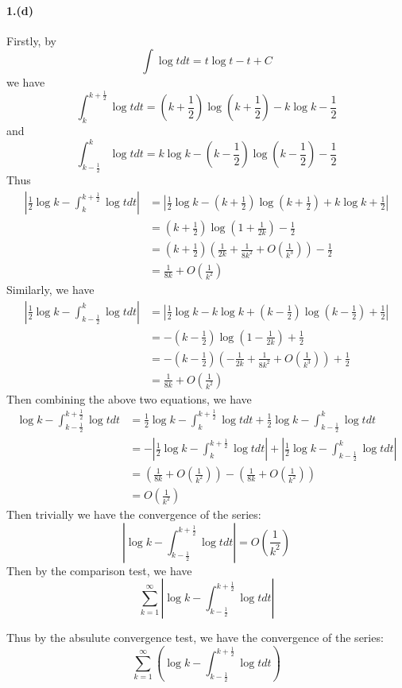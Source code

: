 \documentclass{article}
\begin{document}
\paragraph[short]{1.(d)}
{
  Firstly, by 
  $$\int \log t dt=t\log t-t+C$$
  we have
  $$\int_{k}^{k+\frac{1}{2}}\log t dt =
    (k+\frac{1}{2})\log(k+\frac{1}{2})-k\log k-\frac{1}{2}$$
and
$$\int_{k-\frac{1}{2}}^{k}\log t dt =
    k\log k-(k-\frac{1}{2})\log(k-\frac{1}{2})-\frac{1}{2}$$
Thus   
\begin{align*}
    \left|\frac{1}{2}\log k-\int_{k}^{k+\frac{1}{2}}\log t dt\right|&=\left|\frac{1}{2}\log k-(k+\frac{1}{2})\log(k+\frac{1}{2})+k\log k+\frac{1}{2}\right|\\
    &=(k+\frac{1}{2})\log(1+\frac{1}{2k})-\frac{1}{2}\\
    &=(k+\frac{1}{2})(\frac{1}{2k}+\frac{1}{8k^2}+O(\frac{1}{k^3}))-\frac{1}{2}\\
    &=\frac{1}{8k}+O(\frac{1}{k^2})
\end{align*}
Similarly, we have
\begin{align*}
    \left|\frac{1}{2}\log k-\int_{k-\frac{1}{2}}^{k}\log t dt\right|&=\left|\frac{1}{2}\log k-k\log k+(k-\frac{1}{2})\log(k-\frac{1}{2})+\frac{1}{2}\right|\\
    &=-(k-\frac{1}{2})\log(1-\frac{1}{2k})+\frac{1}{2}\\
    &=-(k-\frac{1}{2})(-\frac{1}{2k}+\frac{1}{8k^2}+O(\frac{1}{k^3}))+\frac{1}{2}\\
    &=\frac{1}{8k}+O(\frac{1}{k^2})
\end{align*}
Then combining the above two equations, we have
\begin{align*}
    \log k-\int_{k-\frac{1}{2}}^{k+\frac{1}{2}}\log t dt&= \frac{1}{2}\log k-\int_{k}^{k+\frac{1}{2}}\log t dt+\frac{1}{2}\log k-\int_{k-\frac{1}{2}}^{k}\log t dt\\
    &=-\left|\frac{1}{2}\log k-\int_{k}^{k+\frac{1}{2}}\log t dt\right|+\left|\frac{1}{2}\log k-\int_{k-\frac{1}{2}}^{k}\log t dt\right|\\
    &=(\frac{1}{8k}+O(\frac{1}{k^2}))-(\frac{1}{8k}+O(\frac{1}{k^2}))\\
    &=O(\frac{1}{k^2})
\end{align*}
Then trivially we have the convergence of the series:
$$\left|\log k-\int_{k-\frac{1}{2}}^{k+\frac{1}{2}}\log t dt \right| =O(\frac{1}{k^2})$$
Then by the comparison test, we have
$$\sum_{k=1}^{\infty}\left|\log k-\int_{k-\frac{1}{2}}^{k+\frac{1}{2}}\log t dt \right|$$
 
Thus by the absulute convergence test, we have the convergence of the series:
$$\sum_{k=1}^{\infty}\left(\log k-\int_{k-\frac{1}{2}}^{k+\frac{1}{2}}\log t dt \right)$$
}
\end{document}
